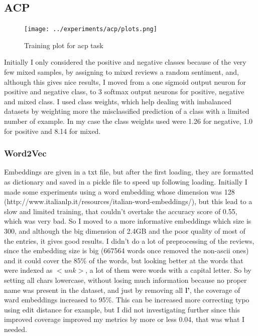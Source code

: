 \documentclass{article}
\begin{document}
        \subsection{ACP}\label{subsec:s1}
            \begin{figure}
                \texttt{[image: ../experiments/acp/plots.png]}
                \caption{Training plot for acp task}
                \label{fig:train-acp}
            \end{figure}
            Initially I only considered the positive and negative classes because of the very few mixed samples, by assigning to
            mixed reviews a random sentiment, and, although this gives nice results, I moved from a one sigmoid output neuron for
            positive and negative class, to 3 softmax output neurons for positive, negative and mixed class.
            I used class weights, which help dealing with imbalanced datasets by weighting more the misclassified prediction of a class
            with a limited number of example.
            In my case the class weights used were 1.26 for negative, 1.0 for positive and 8.14 for mixed.
            \subsubsection{Word2Vec}
            Embeddings are given in a txt file, but after the first loading, they are formatted as dictionary and saved in a pickle file
            to speed up following loading.
            Initially I made some experiments using a word embedding whose dimension was 128 (http://www.italianlp.it/resources/italian-word-embeddings/), but this lead to a slow and limited training, that couldn't overtake the accuracy score of 0.55, which was very bad.
            So I moved to a more informative embeddings which size is 300, and although the big dimension of 2.4GB and the poor quality of most of the entries, it gives good results.
            I didn't do a lot of preprocessing of the reviews, since the embedding size is big (667564 words once removed the non-ascii ones) and it could cover the 85\% of the words, but looking better at the words that were indexed as $<unk>$, a lot of them were words with a capital letter.
            So by setting all chars lowercase, without losing much information because no proper name was present in the dataset, and just by removing all \textbf{l'}, the coverage of ward embeddings increased to 95\%.
            This can be increased more correcting typo using edit distance for example, but I did not investigating further since this improved coverage improved my metrics by more or less 0.04, that was what I needed.
\end{document}
